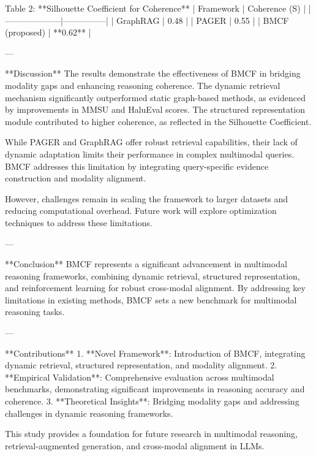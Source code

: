 Table 2: **Silhouette Coefficient for Coherence**  
| Framework         | Coherence (S) |
|--------------------|---------------|
| GraphRAG          | 0.48          |
| PAGER             | 0.55          |
| BMCF (proposed)   | **0.62**      |

---

**Discussion**  
The results demonstrate the effectiveness of BMCF in bridging modality gaps and enhancing reasoning coherence. The dynamic retrieval mechanism significantly outperformed static graph-based methods, as evidenced by improvements in MMSU and HaluEval scores. The structured representation module contributed to higher coherence, as reflected in the Silhouette Coefficient.  

While PAGER and GraphRAG offer robust retrieval capabilities, their lack of dynamic adaptation limits their performance in complex multimodal queries. BMCF addresses this limitation by integrating query-specific evidence construction and modality alignment.  

However, challenges remain in scaling the framework to larger datasets and reducing computational overhead. Future work will explore optimization techniques to address these limitations.  

---

**Conclusion**  
BMCF represents a significant advancement in multimodal reasoning frameworks, combining dynamic retrieval, structured representation, and reinforcement learning for robust cross-modal alignment. By addressing key limitations in existing methods, BMCF sets a new benchmark for multimodal reasoning tasks.  

---

**Contributions**  
1. **Novel Framework**: Introduction of BMCF, integrating dynamic retrieval, structured representation, and modality alignment.  
2. **Empirical Validation**: Comprehensive evaluation across multimodal benchmarks, demonstrating significant improvements in reasoning accuracy and coherence.  
3. **Theoretical Insights**: Bridging modality gaps and addressing challenges in dynamic reasoning frameworks.  

This study provides a foundation for future research in multimodal reasoning, retrieval-augmented generation, and cross-modal alignment in LLMs.  